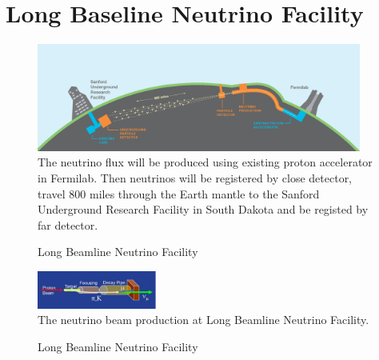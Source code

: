 \section{Long Baseline Neutrino Facility}

\begin{figure}
\caption{Long Beamline Neutrino Facility}
\label{fig:LBNF_overallScheme}
\centering
\includegraphics[width=0.95\textwidth, keepaspectratio=true]{figs/LBNF_overallScheme.png}
\\The neutrino flux will be produced using existing proton accelerator in Fermilab. Then neutrinos will be registered by close detector, travel 800 miles through the Earth mantle to the Sanford Underground Research Facility in South Dakota and be registed by far detector. \cite{ref_LBNFweb}   
\end{figure}

\begin{figure}
\caption{Long Beamline Neutrino Facility}
\label{fig:LBNF_nuBeam}
\centering
\includegraphics[width=0.35\textwidth, keepaspectratio=true]{figs/LBNF_nuBeam.png}
\\The neutrino beam production at Long Beamline Neutrino Facility. \cite{ref_LBNFweb}   
\end{figure}

